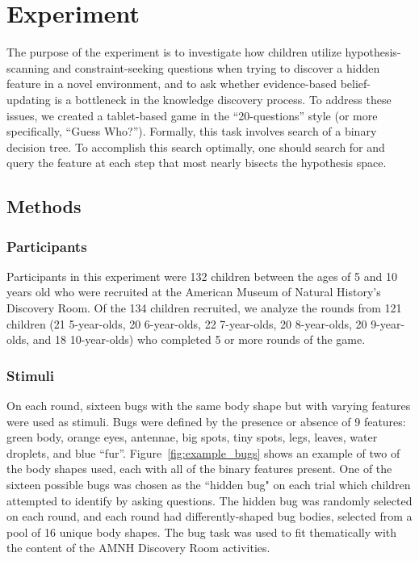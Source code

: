 \documentclass[man,floatsintext]{apa6}
\begin{document}
\section{Experiment}
The purpose of the experiment is to investigate how children utilize hypothesis-
scanning and constraint-seeking questions when trying to discover a hidden feature 
in a novel environment, and to ask whether evidence-based belief-updating is a 
bottleneck in the knowledge discovery process. To address these issues, we created 
a tablet-based game in the ``20-questions'' style (or more specifically, ``Guess 
Who?''). Formally, this task involves search of a binary decision tree. To accomplish 
this search optimally, one should search for and query the feature at each step that 
most nearly bisects the hypothesis space.

\subsection{Methods}
\subsubsection{Participants}

Participants in this experiment were 132 children between the ages of 5 and 10 
years old who were recruited at the American Museum of Natural History's 
Discovery Room. Of the 134 children recruited, we analyze the rounds from 121 
children (21 5-year-olds, 20 6-year-olds, 22 7-year-olds, 20 8-year-olds, 20 9-year-olds, 
and 18 10-year-olds) who completed 5 or more rounds of the game.

\subsubsection{Stimuli}

On each round, sixteen bugs with the same body shape but with varying features were used as stimuli. Bugs were defined by the presence or absence of 9 features: green body, 
orange eyes, antennae, big spots, tiny spots, legs, leaves, water droplets, and blue 
``fur''. Figure~\ref{fig:example_bugs} shows an example of two of the body shapes used, each with all of the binary features present. One of the sixteen possible bugs was chosen as the ``hidden bug" on each trial which 
children attempted to identify by asking questions. The hidden bug was 
randomly selected on each round, and each round had differently-shaped bug 
bodies, selected from a pool of 16 unique body shapes.  The bug task was used to fit thematically with the content of the AMNH Discovery Room activities.
\end{document}

